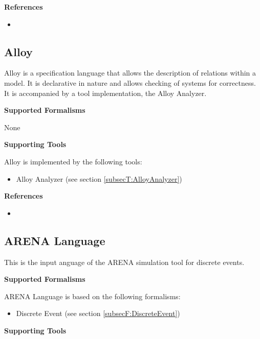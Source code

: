 \textbf{References}
\begin{itemize}
	
\item {}
\end{itemize}



\subsection{Alloy}
\label{subsecL:Alloy}


Alloy is a specification language that allows the description of relations within a model. It is declarative in nature and allows checking of systems for correctness.
It is accompanied by a tool implementation, the Alloy Analyzer.

\textbf{Supported Formalisms}

None


\textbf{Supporting Tools}

Alloy is implemented by the following tools:
\begin{itemize}
	\item Alloy Analyzer (see section \ref{subsecT:AlloyAnalyzer})
\end{itemize}


\textbf{References}
\begin{itemize}
	
\item {}
\end{itemize}



\subsection{ARENA Language}
\label{subsecL:ARENALanguage}


This is the input anguage of the ARENA simulation tool for discrete events.

\textbf{Supported Formalisms}

ARENA Language is based on the following formalisms:
\begin{itemize}
	\item Discrete Event (see section \ref{subsecF:DiscreteEvent})
\end{itemize}


\textbf{Supporting Tools}

